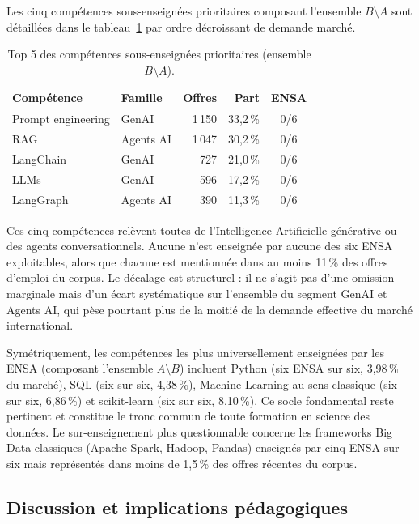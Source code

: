 \documentclass[11pt,a4paper,openany]{report}
\begin{document}
Les cinq comp\'etences sous-enseign\'ees prioritaires composant l'ensemble $B \setminus A$ sont d\'etaill\'ees dans le tableau~\ref{tab:gap-priority} par ordre d\'ecroissant de demande march\'e.

\begin{table}[H]
  \centering
  \caption{Top 5 des comp\'etences sous-enseign\'ees prioritaires (ensemble $B \setminus A$).}
  \label{tab:gap-priority}
  \begin{tabular}{llrrc}
    \toprule
    \rowcolor{softblue}\textbf{Comp\'etence} & \textbf{Famille} & \textbf{Offres} & \textbf{Part} & \textbf{ENSA} \\
    \midrule
    Prompt engineering & GenAI & 1\,150 & 33,2\,\% & 0/6 \\
    RAG & Agents AI & 1\,047 & 30,2\,\% & 0/6 \\
    LangChain & GenAI & 727 & 21,0\,\% & 0/6 \\
    LLMs & GenAI & 596 & 17,2\,\% & 0/6 \\
    LangGraph & Agents AI & 390 & 11,3\,\% & 0/6 \\
    \bottomrule
  \end{tabular}
\end{table}

Ces cinq comp\'etences rel\`event toutes de l'Intelligence Artificielle g\'en\'erative ou des agents conversationnels. Aucune n'est enseign\'ee par aucune des six ENSA exploitables, alors que chacune est mentionn\'ee dans au moins 11\,\% des offres d'emploi du corpus. Le d\'ecalage est structurel : il ne s'agit pas d'une omission marginale mais d'un \'ecart syst\'ematique sur l'ensemble du segment GenAI et Agents AI, qui p\`ese pourtant plus de la moiti\'e de la demande effective du march\'e international.

Sym\'etriquement, les comp\'etences les plus universellement enseign\'ees par les ENSA (composant l'ensemble $A \setminus B$) incluent Python (six ENSA sur six, 3,98\,\% du march\'e), SQL (six sur six, 4,38\,\%), Machine Learning au sens classique (six sur six, 6,86\,\%) et scikit-learn (six sur six, 8,10\,\%). Ce socle fondamental reste pertinent et constitue le tronc commun de toute formation en science des donn\'ees. Le sur-enseignement plus questionnable concerne les frameworks Big Data classiques (Apache Spark, Hadoop, Pandas) enseign\'es par cinq ENSA sur six mais repr\'esent\'es dans moins de 1,5\,\% des offres r\'ecentes du corpus.

\subsection{Discussion et implications p\'edagogiques}
\end{document}

